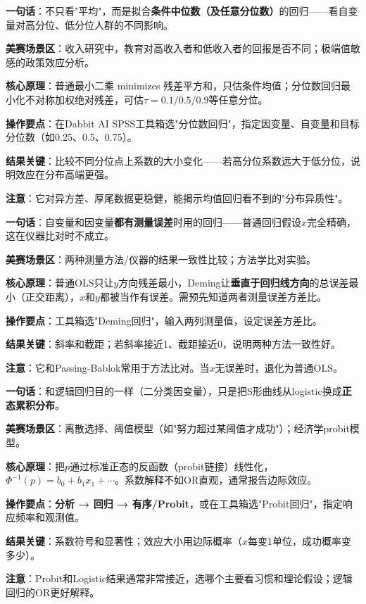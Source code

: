 
\begin{algobrief}
\textbf{一句话}：不只看"平均"，而是拟合\textbf{条件中位数（及任意分位数）}的回归——看自变量对高分位、低分位人群的不同影响。

\textbf{美赛场景区}：收入研究中，教育对高收入者和低收入者的回报是否不同；极端值敏感的政策效应分析。

\textbf{核心原理}：普通最小二乘 minimizes 残差平方和，只估条件均值；分位数回归最小化不对称加权绝对残差，可估$\tau=0.1/0.5/0.9$等任意分位。

\textbf{操作要点}：在Dabbit AI SPSS工具箱选"分位数回归"，指定因变量、自变量和目标分位数（如0.25、0.5、0.75）。

\textbf{结果关键}：比较不同分位点上系数的大小变化——若高分位系数远大于低分位，说明效应在分布高端更强。

\textbf{注意}：它对异方差、厚尾数据更稳健，能揭示均值回归看不到的"分布异质性"。
\end{algobrief}


\begin{algobrief}
\textbf{一句话}：自变量和因变量\textbf{都有测量误差}时用的回归——普通回归假设$x$完全精确，这在仪器比对时不成立。

\textbf{美赛场景区}：两种测量方法/仪器的结果一致性比较；方法学比对实验。

\textbf{核心原理}：普通OLS只让$y$方向残差最小，Deming让\textbf{垂直于回归线方向}的总误差最小（正交距离），$x$和$y$都被当作有误差。需预先知道两者测量误差方差比。

\textbf{操作要点}：工具箱选"Deming回归"，输入两列测量值，设定误差方差比。

\textbf{结果关键}：斜率和截距；若斜率接近1、截距接近0，说明两种方法一致性好。

\textbf{注意}：它和Passing-Bablok常用于方法比对。当$x$无误差时，退化为普通OLS。
\end{algobrief}


\begin{algobrief}
\textbf{一句话}：和逻辑回归目的一样（二分类因变量），只是把S形曲线从logistic换成\textbf{正态累积分布}。

\textbf{美赛场景区}：离散选择、阈值模型（如"努力超过某阈值才成功"）；经济学probit模型。

\textbf{核心原理}：把$p$通过标准正态的反函数（probit链接）线性化，$\Phi^{-1}(p)=b_0+b_1x_1+\cdots$。系数解释不如OR直观，通常报告边际效应。

\textbf{操作要点}：\textbf{分析 → 回归 → 有序/Probit}，或在工具箱选"Probit回归"，指定响应频率和观测值。

\textbf{结果关键}：系数符号和显著性；效应大小用边际概率（$x$每变1单位，成功概率变多少）。

\textbf{注意}：Probit和Logistic结果通常非常接近，选哪个主要看习惯和理论假设；逻辑回归的OR更好解释。
\end{algobrief}

